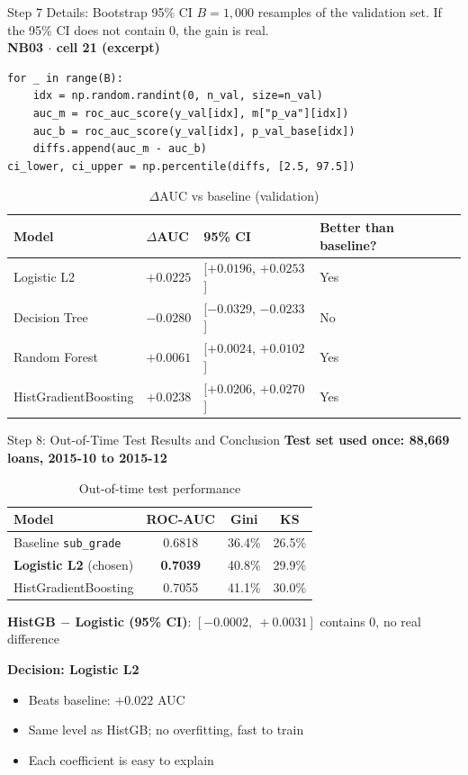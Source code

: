 \documentclass{beamer}
\newcommand{\code}[1]{\texttt{\small #1}}
\begin{document}
\begin{frame}[fragile]{Step 7 Details: Bootstrap 95\% CI}
  $B=1{,}000$ resamples of the validation set. If the 95\% CI does not contain 0, the gain is real.\\[0.1cm]
  \textbf{\scriptsize NB03 $\cdot$ cell 21 (excerpt)}
\begin{lstlisting}
for _ in range(B):
    idx = np.random.randint(0, n_val, size=n_val)
    auc_m = roc_auc_score(y_val[idx], m["p_va"][idx])
    auc_b = roc_auc_score(y_val[idx], p_val_base[idx])
    diffs.append(auc_m - auc_b)
ci_lower, ci_upper = np.percentile(diffs, [2.5, 97.5])
\end{lstlisting}
  \begin{table}
    \centering
    \tiny
    \caption{$\Delta$AUC vs baseline (validation)}
    \begin{tabular}{llll}
      \hline
      \textbf{Model} & \textbf{$\Delta$AUC} & \textbf{95\% CI} & \textbf{Better than baseline?}\\
      \hline
      Logistic L2 & $+0.0225$ & [$+0.0196$, $+0.0253$] & Yes\\
      Decision Tree & $-0.0280$ & [$-0.0329$, $-0.0233$] & No\\
      Random Forest & $+0.0061$ & [$+0.0024$, $+0.0102$] & Yes\\
      HistGradientBoosting & $+0.0238$ & [$+0.0206$, $+0.0270$] & Yes\\
      \hline
    \end{tabular}
  \end{table}
\end{frame}
\begin{frame}{Step 8: Out-of-Time Test Results and Conclusion}
    \textbf{Test set used once: 88,669 loans, 2015-10 to 2015-12}
    \begin{table}
        \centering
        \small
        \caption{Out-of-time test performance}
        \begin{tabular}{lccc}
            \hline
            \textbf{Model} & \textbf{ROC-AUC} & \textbf{Gini} & \textbf{KS} \\
            \hline
            Baseline \code{sub\_grade} & 0.6818 & 36.4\% & 26.5\% \\
            \textbf{Logistic L2} (chosen) & \textbf{0.7039} & 40.8\% & 29.9\% \\
            HistGradientBoosting & 0.7055 & 41.1\% & 30.0\% \\
            \hline
        \end{tabular}
    \end{table}
    \textbf{HistGB $-$ Logistic (95\% CI)}: $[-0.0002,\ +0.0031]$ contains 0, no real difference

    \vspace{0.2cm}
    \textbf{Decision: Logistic L2}
    \begin{itemize}
        \item Beats baseline: $+0.022$ AUC
        \item Same level as HistGB; no overfitting, fast to train
        \item Each coefficient is easy to explain
    \end{itemize}
\end{frame}
\end{document}
